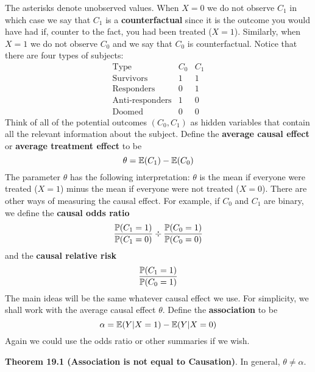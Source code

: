 The asterisks denote unobserved values. When \(X = 0\) we do not observe
\(C_{1}\) in which case we say that \(C_{1}\) is a \textbf{counterfactual}
since it is the outcome you would have had if, counter to the fact, you
had been treated (\(X = 1\)). Similarly, when \(X = 1\) we do not observe
\(C_{0}\) and we say that \(C_{0}\) is counterfactual.
Notice that there are four types of subjects:
\[
\begin{array}{lcc}
\text{Type} & C_{0} & C_{1} \\
\hline
\text{Survivors}       & 1 & 1 \\
\text{Responders}      & 0 & 1 \\
\text{Anti-responders} & 1 & 0 \\
\text{Doomed}          & 0 & 0
\end{array}
\]
Think of all of the potential outcomes \((C_{0}, C_{1})\) as hidden
variables that contain all the relevant information about the subject.
Define the \textbf{average causal effect} or \textbf{average treatment
effect} to be
\[
\theta = \operatorname{\mathbb{E}}(C_{1}) - \operatorname{\mathbb{E}}(C_{0})
\]
The parameter \(\theta\) has the following interpretation: \(\theta\) is
the mean if everyone were treated (\(X = 1\)) minus the mean if everyone
were not treated (\(X = 0\)). There are other ways of measuring the
causal effect. For example, if \(C_{0}\) and \(C_{1}\) are binary, we define
the \textbf{causal odds ratio}
\[
\frac{\operatorname{\mathbb{P}}(C_{1} = 1)}{\operatorname{\mathbb{P}}(C_{1} = 0)} \div \frac{\operatorname{\mathbb{P}}(C_{0} = 1)}{\operatorname{\mathbb{P}}(C_{0} = 0)}
\]
and the \textbf{causal relative risk}
\[
\frac{\operatorname{\mathbb{P}}(C_{1} = 1)}{\operatorname{\mathbb{P}}(C_{0} = 1)}
\]
The main ideas will be the same whatever causal effect we use. For
simplicity, we shall work with the average causal effect \(\theta\).
Define the \textbf{association} to be
\[
\alpha = \operatorname{\mathbb{E}}(Y | X = 1) - \operatorname{\mathbb{E}}(Y | X = 0)
\]
Again we could use the odds ratio or other summaries if we wish.

\textbf{Theorem 19.1 (Association is not equal to Causation)}. In
general, \(\theta \neq \alpha\).

